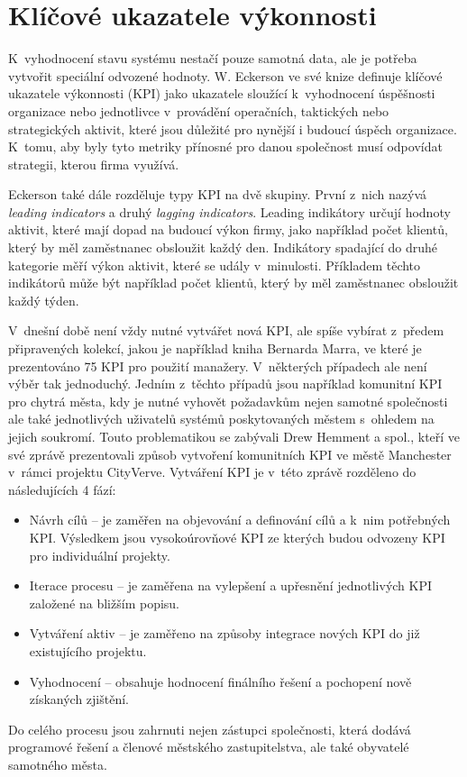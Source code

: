 \section{Klíčové ukazatele výkonnosti}
K~vyhodnocení stavu systému nestačí pouze samotná data, ale je potřeba vytvořit speciální odvozené hodnoty. W. Eckerson ve své knize \cite{eckerson2010performance} definuje klíčové ukazatele výkonnosti (KPI) jako ukazatele sloužící k~vyhodnocení úspěšnosti organizace nebo jednotlivce v~provádění operačních, taktických nebo strategických aktivit, které jsou důležité pro nynější i budoucí úspěch organizace. K~tomu, aby byly tyto metriky přínosné pro danou společnost musí odpovídat strategii, kterou firma využívá. 

Eckerson také dále rozděluje typy KPI na dvě skupiny. První z~nich nazývá \textit{leading indicators} a druhý \textit{lagging indicators}. Leading indikátory určují hodnoty aktivit, které mají dopad na budoucí výkon firmy, jako například počet klientů, který by měl zaměstnanec obsloužit každý den. Indikátory spadající do druhé kategorie měří výkon aktivit, které se udály v~minulosti. Příkladem těchto indikátorů může být například počet klientů, který by měl zaměstnanec obsloužit každý týden. 

V~dnešní době není vždy nutné vytvářet nová KPI, ale spíše vybírat z~předem připravených kolekcí, jakou je například kniha \cite{marr2012key} Bernarda Marra, ve které je prezentováno 75 KPI pro použití manažery. V~některých případech ale není výběr tak jednoduchý. Jedním z~těchto případů jsou například komunitní KPI pro chytrá města, kdy je nutné vyhovět požadavkům nejen samotné společnosti ale také jednotlivých uživatelů systémů poskytovaných městem s~ohledem na jejich soukromí. Touto problematikou se zabývali Drew Hemment a spol., kteří ve své zprávě \cite{hemment2016community} prezentovali způsob vytvoření komunitních KPI ve městě Manchester v~rámci projektu CityVerve. 
Vytváření KPI je v~této zprávě rozděleno do následujících 4 fází:
\begin{itemize}
\item Návrh cílů -- je zaměřen na objevování a definování cílů a k~nim potřebných KPI. Výsledkem jsou vysokoúrovňové KPI ze kterých budou odvozeny KPI pro individuální projekty.
\item Iterace procesu -- je zaměřena na vylepšení a upřesnění jednotlivých KPI založené na bližším popisu.
\item Vytváření aktiv -- je zaměřeno na způsoby integrace nových KPI do již existujícího projektu.
\item Vyhodnocení -- obsahuje hodnocení finálního řešení a pochopení nově získaných zjištění.
\end{itemize}
Do celého procesu jsou zahrnuti nejen zástupci společnosti, která dodává programové řešení a členové městského zastupitelstva, ale také obyvatelé samotného města.

